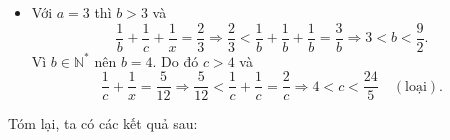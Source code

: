 \begin{bt}
{\begin{itemize}
\begin{itemize}
\begin{itemize}
			\item [] Với $c=10$ thì $\dfrac{1}{10}+\dfrac{1}{x}=\dfrac{1}{6}\Leftrightarrow x=15$, ta thấy $\dfrac{x}{c}=\dfrac{3}{2}\notin \mathbb{N}^*$ (loại).
			\item [] Với $c=11$ thì $\dfrac{1}{11}+\dfrac{1}{x}=\dfrac{1}{6}\Leftrightarrow x=\dfrac{66}{5}\notin \mathbb{N}^*$ (loại).
			\item [] Với $c=12$ thì $\dfrac{1}{12}+\dfrac{1}{x}=\dfrac{1}{6}\Leftrightarrow x=12$ (thỏa mãn).
		\end{itemize}
		\item [+] Nếu $b=4$ thì 
		\[\dfrac{1}{c}+\dfrac{1}{x}=\dfrac{1}{4}\Rightarrow \dfrac{1}{c}<\dfrac{1}{4}\le \dfrac{1}{c}+\dfrac{1}{c}=\dfrac{2}{c}\Rightarrow 4<c\le 8.\]
		Vì $c\in\mathbb{N}^*$ nên $c\in \{5,6,7,8\}$.
		\begin{itemize}
			\item [] Với $c=5$ thì $\dfrac{1}{5}+\dfrac{1}{x}=\dfrac{1}{4}\Leftrightarrow x=20$ (thỏa mãn).
			\item [] Với $c=6$ thì $\dfrac{1}{6}+\dfrac{1}{x}=\dfrac{1}{4}\Leftrightarrow x=12$ (thỏa mãn).
			\item [] Với $c=7$ thì $\dfrac{1}{7}+\dfrac{1}{x}=\dfrac{1}{4}\Leftrightarrow x=\dfrac{28}{3}\notin \mathbb{N}^*$ (loại).
			\item [] Với $c=8$ thì $\dfrac{1}{8}+\dfrac{1}{x}=\dfrac{1}{4}\Leftrightarrow x=8$ (thỏa mãn).
		\end{itemize}
	\item [+] Nếu $b=5$ thì $c>5$ và 
	\[\dfrac{1}{c}+\dfrac{1}{x}=\dfrac{3}{10}\Rightarrow \dfrac{3}{10}\le \dfrac{1}{c}+\dfrac{1}{c}=\dfrac{2}{c}\Rightarrow 5<c<\dfrac{20}{3}.\]
	Vì $c\in\mathbb{N}^*$ nên $c=6$, ta được $\dfrac{1}{x}=\dfrac{3}{10}-\dfrac{1}{6}=\dfrac{2}{15}\Leftrightarrow x=\dfrac{15}{2}\notin \mathbb{N}^*$.
	\end{itemize}
	\item Với $a=3$ thì $b>3$ và 
	\[\dfrac{1}{b}+\dfrac{1}{c}+\dfrac{1}{x}=\dfrac{2}{3}\Rightarrow \dfrac{2}{3}<\dfrac{1}{b}+\dfrac{1}{b}+\dfrac{1}{b}=\dfrac{3}{b}\Rightarrow 3<b<\dfrac{9}{2}.\]
	Vì $b\in\mathbb{N}^*$ nên $b=4$. Do đó $c>4$ và
	\[\dfrac{1}{c}+\dfrac{1}{x}=\dfrac{5}{12}\Rightarrow \dfrac{5}{12}<\dfrac{1}{c}+\dfrac{1}{c}=\dfrac{2}{c}\Rightarrow 4<c<\dfrac{24}{5}\quad (\text{loại}).\]
\end{itemize}
Tóm lại, ta có các kết quả sau:
\begin{center}
	\begin{longtable}{|c|c|c|c|c|c|c|c|}
		\hline

\end{longtable}
\end{center}}
\end{bt}

